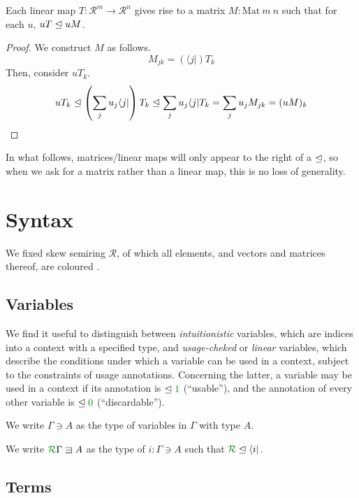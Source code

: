 \documentclass[submission,copyright,creativecommons]{eptcs}
\begin{document}
\begin{lemma}
  Each linear map $T : \mathscr R^m \to \mathscr R^n$ gives rise to a matrix
  $M : \mathrm{Mat}~m~n$ such that for each $u$, $uT \trianglelefteq uM$.
\end{lemma}
\begin{proof}
  We construct $M$ as follows.
  \[
    M_{jk} = (\langle j \rvert)T_k
  \]
  Then, consider $uT_k$.
  \[
    uT_k \trianglelefteq \left(\sum_j u_j\langle j \rvert\right)T_k
    \trianglelefteq \sum_j u_j\langle j \rvert T_k
    = \sum_j u_j M_{jk} = (uM)_k
  \]
\end{proof}

In what follows, matrices/linear maps will only appear to the right of a
$\trianglelefteq$, so when we ask for a matrix rather than a linear map, this is no loss
of generality.

\section{Syntax}

We fixed skew semiring $\mathscr R$, of which all elements, and vectors and
matrices thereof, are coloured .

\subsection{Variables}

We find it useful to distinguish between \emph{intuitionistic} variables, which
are indices into a context with a specified type, and \emph{usage-cheked} or
\emph{linear} variables, which describe the conditions under which a variable
can be used in a context, subject to the constraints of usage annotations.
Concerning the latter, a variable may be used in a context if its annotation is
$\subres \rescomment 1$ (``usable''), and the annotation of every other variable
is $\subres \rescomment 0$ (``discardable'').

\begin{definition}
  We write $\Gamma \ni A$ as the type of variables in $\Gamma$ with type $A$.
\end{definition}

\begin{definition}
  We write $\ctx{\Gamma}{R} \lvar A$ as the type of $i : \Gamma \ni A$ such that
  $\resctx R \subres \langle i \rvert$.
\end{definition}

\subsection{Terms}
\end{document}
